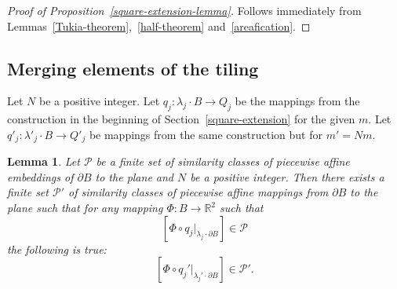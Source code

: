 \documentclass[12pt]{article}
\newtheorem{lemm}[prop]{Lemma}
\theoremstyle{definition}
\begin{document}
\begin{proof}[Proof of Proposition~\ref{square-extension-lemma}]
Follows immediately from Lemmas~\ref{Tukia-theorem},~\ref{half-theorem} and~\ref{areafication}.
\end{proof}

\subsection{Merging elements of the tiling}
\label{merge-tiling}
Let $N$ be a positive integer. Let $q_j:\lambda_j\cdot B\to Q_j$ be the mappings from the construction in the beginning of Section~\ref{square-extension} for the given $m.$ Let $q'_j:\lambda'_j\cdot B\to Q'_j$ be mappings from the same construction but for $m' = Nm.$

\begin{lemm}
\label{merging-elements-of-tiling-lemma}
Let $\mathcal P$ be a finite set of similarity classes of piecewise affine embeddings of $\partial B$ to the plane and $N$ be a positive integer. Then there exists a finite set $\mathcal P'$ of similarity classes of piecewise affine mappings from $\partial B$ to the plane such that for any mapping $\Phi:B\to\mathbb R^2$ such that
$$\left[\Phi\circ q_j\big|_{\lambda_j\cdot\partial B}\right]\in\mathcal P$$
the following is true:
$$
\left[\Phi\circ q_j'\big|_{\lambda_j'\cdot\partial B}\right]\in\mathcal P'.
$$
\end{lemm}
\end{document}
